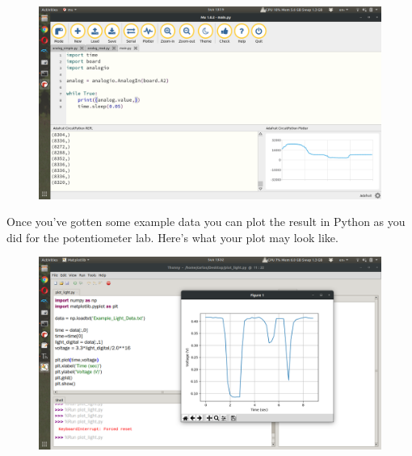 \begin{figure}[H]
  \begin{center}
    \includegraphics[width=\textwidth]{Figures/photocell_mu.png}
  \end{center}
\end{figure}
Once you’ve gotten some example data you can plot the result in Python as you did for the potentiometer lab. Here’s what your plot may look like.
\begin{figure}[H]
  \begin{center}
    \includegraphics[width=\textwidth]{Figures/photocell_plots.png}
  \end{center}
\end{figure}
